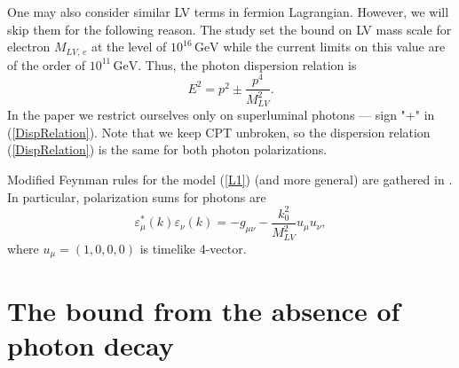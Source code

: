 \documentclass[12pt]{article}
\begin{document}
One may also consider similar LV terms in fermion Lagrangian. However, we will skip them for the following reason. The study \cite{Liberati:2012jf} set the bound on LV mass scale for electron $M_{LV,\,e}$ at the level of $10^{16}\,\mbox{GeV}$ while the current limits \cite{Vasileiou:2013vra} on this value are of the order of $10^{11}\,\mbox{GeV}$. Thus, the photon dispersion relation is
\begin{equation}
\label{DispRelation}
E^2 = p^2 \pm \frac{p^4}{M_{LV}^2}.
\end{equation}
In the paper we restrict ourselves only on superluminal photons --- sign "+" in (\ref{DispRelation}). Note that we keep CPT unbroken, so the dispersion relation (\ref{DispRelation}) is the same for both photon polarizations.

Modified Feynman rules for the model (\ref{L1}) (and more general) are gathered in \cite{Rubtsov:2012kb}. In particular, polarization sums for photons are
\begin{equation}
\label{polarizationsums}
\varepsilon_\mu^*(k)\varepsilon_\nu(k) = -g_{\mu\nu} - \frac{k_0^2}{M_{LV}^2}u_\mu u_\nu,
\end{equation}
where $u_\mu=(1,0,0,0)$ is timelike 4-vector.

\section{The bound from the absence of photon decay}
\end{document}
